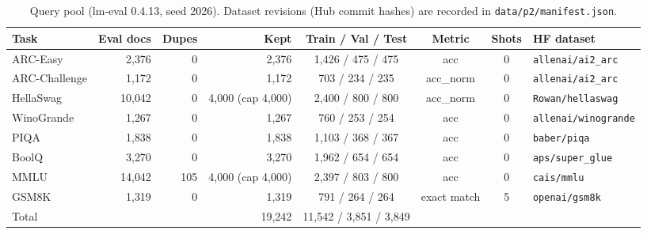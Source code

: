 \begin{table}[!htbp]\centering\small
\begin{tabular}{lrrrcccl}
\toprule
Task & Eval docs & Dupes & Kept & Train / Val / Test & Metric & Shots & HF dataset \\
\midrule
ARC-Easy & 2{,}376 & 0 & 2{,}376 & 1{,}426 / 475 / 475 & acc & 0 & \texttt{allenai/ai2\_arc} \\
ARC-Challenge & 1{,}172 & 0 & 1{,}172 & 703 / 234 / 235 & acc\_norm & 0 & \texttt{allenai/ai2\_arc} \\
HellaSwag & 10{,}042 & 0 & 4{,}000 (cap 4{,}000) & 2{,}400 / 800 / 800 & acc\_norm & 0 & \texttt{Rowan/hellaswag} \\
WinoGrande & 1{,}267 & 0 & 1{,}267 & 760 / 253 / 254 & acc & 0 & \texttt{allenai/winogrande} \\
PIQA & 1{,}838 & 0 & 1{,}838 & 1{,}103 / 368 / 367 & acc & 0 & \texttt{baber/piqa} \\
BoolQ & 3{,}270 & 0 & 3{,}270 & 1{,}962 / 654 / 654 & acc & 0 & \texttt{aps/super\_glue} \\
MMLU & 14{,}042 & 105 & 4{,}000 (cap 4{,}000) & 2{,}397 / 803 / 800 & acc & 0 & \texttt{cais/mmlu} \\
GSM8K & 1{,}319 & 0 & 1{,}319 & 791 / 264 / 264 & exact match & 5 & \texttt{openai/gsm8k} \\
\midrule Total & & & 19{,}242 & 11{,}542 / 3{,}851 / 3{,}849 & & & \\
\bottomrule
\end{tabular}
\caption{Query pool (lm-eval 0.4.13, seed 2026). Dataset revisions (Hub commit hashes) are recorded in \texttt{data/p2/manifest.json}.}
\label{tab:pool}
\end{table}
